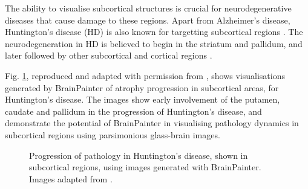 \documentclass{llncs}
\begin{document}
The ability to visualise subcortical structures is crucial for neurodegenerative diseases that cause damage to these regions. Apart from Alzheimer's disease, Huntington's disease (HD) is also known for targetting subcortical regions \cite{douaud2009vivo,wijeratne2018image}. The neurodegeneration in HD is believed to begin in the striatum and pallidum, and later followed by other subcortical and cortical regions \cite{douaud2009vivo}.

Fig. \ref{fig:peter}, reproduced and adapted with permission from \cite{wijeratne2018image}, shows visualisations generated by BrainPainter of atrophy progression in subcortical areas, for Huntington's disease. The images show early involvement of the putamen, caudate and pallidum in the progression of Huntington's disease, and demonstrate the potential of BrainPainter in visualising pathology dynamics in subcortical regions using parsimonious glass-brain images.


\begin{figure}[htp]
\centering
 \caption{Progression of pathology in Huntington's disease, shown in subcortical regions, using images generated with BrainPainter. Images adapted from \cite{wijeratne2018image}.}
   \label{fig:peter}
\end{figure}
\end{document}
